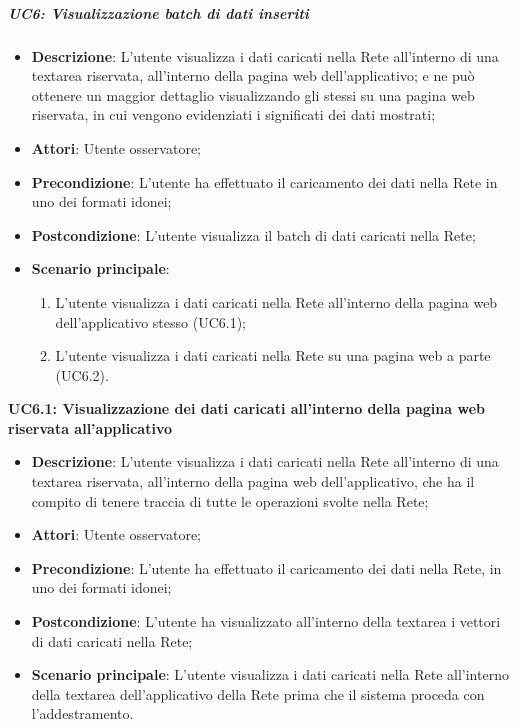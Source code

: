 \subparagraph{UC6: Visualizzazione batch di dati inseriti}\mbox{}
\label{UC6: Visualizzazione batch di dati inseriti}
\noindent
\begin{itemize}
\item \textbf{Descrizione}: L'utente visualizza i dati caricati nella Rete all'interno di una textarea riservata, all'interno della pagina web dell'applicativo; e ne pu\`o ottenere un maggior dettaglio visualizzando gli stessi su una pagina web riservata, in cui vengono evidenziati i significati dei dati mostrati;
\item \textbf{Attori}: Utente osservatore;
\item \textbf{Precondizione}: L'utente ha  effettuato il caricamento dei dati nella Rete in uno dei formati idonei;
\item \textbf{Postcondizione}: L'utente visualizza il batch di dati caricati nella Rete;
\item \textbf{Scenario principale}:
\begin{enumerate}
\item L'utente visualizza i dati caricati nella Rete all'interno della pagina web dell'applicativo stesso (UC6.1);
\item L'utente visualizza i dati caricati nella Rete su una pagina web a parte (UC6.2).
\end{enumerate}
\end{itemize}

\textbf{UC6.1: Visualizzazione dei dati caricati all'interno della pagina web riservata all'applicativo}\mbox{}
\label{UC6.1: Visualizzazione dei dati caricati all'interno della pagina web riservata all'applicativo}
\noindent
\begin{itemize}
\item \textbf{Descrizione}: L'utente visualizza i dati caricati nella Rete all'interno di una textarea riservata, all'interno della pagina web dell'applicativo, che ha il compito di tenere traccia di tutte le operazioni svolte nella Rete;
\item \textbf{Attori}: Utente osservatore;
\item \textbf{Precondizione}: L'utente ha  effettuato il caricamento dei dati nella Rete, in uno dei formati idonei;
\item \textbf{Postcondizione}: L'utente ha visualizzato all'interno della textarea i vettori di dati caricati nella Rete;
\item \textbf{Scenario principale}: L'utente visualizza i dati caricati nella Rete all'interno della textarea dell'applicativo della Rete prima che il sistema proceda con l'addestramento.
\end{itemize}

